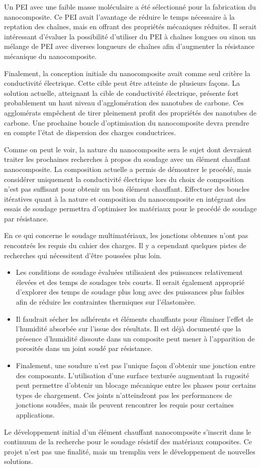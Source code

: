 Un PEI avec une faible masse moléculaire a été sélectionné pour la fabrication du nanocomposite. 
Ce PEI avait l'avantage de réduire le temps nécessaire à la reptation des chaînes, mais en offrant des propriétés mécaniques réduites. 
Il serait intéressant d'évaluer la possibilité d'utiliser du PEI à chaînes longues ou sinon un mélange de PEI avec diverses longueurs de chaînes afin d'augmenter la résistance mécanique du nanocomposite. 

Finalement, la conception initiale du nanocomposite avait comme seul critère la conductivité électrique. 
Cette cible peut être atteinte de plusieurs façons. 
La solution actuelle, atteignant la cible de conductivité électrique, présente fort probablement un haut niveau d'agglomération des nanotubes de carbone. 
Ces agglomérats empêchent de tirer pleinement profit des propriétés des nanotubes de carbone. 
Une prochaine boucle d'optimisation du nanocomposite devra prendre en compte l'état de dispersion des charges conductrices. 

Comme on peut le voir, la nature du nanocomposite sera le sujet dont devraient traiter les prochaines recherches à propos du soudage avec un élément chauffant nanocomposite. 
La composition actuelle a permis de démontrer le procédé, mais considérer uniquement la conductivité électrique lors du choix de composition n'est pas suffisant pour obtenir un bon élément chauffant.
Effectuer des boucles itératives quant à la nature et composition du nanocomposite en intégrant des essais de soudage permettra d'optimiser les matériaux pour le procédé de soudage par résistance. 

En ce qui concerne le soudage multimatériaux, les jonctions obtenues n'ont pas rencontrés les requis du cahier des charges. 
Il y a cependant quelques pistes de recherches qui nécessitent d'être poussées plus loin. 

\begin{itemize}
	\item Les conditions de soudage évaluées utilisaient des puissances relativement élevées et des temps de soudages très courts. 
	Il serait également approprié d'explorer des temps de soudage plus long avec des puissances plus faibles afin de réduire les contraintes thermiques sur l'élastomère. 
	\item Il faudrait sécher les adhérents et éléments chauffants pour éliminer l'effet de l'humidité absorbée sur l'issue des résultats. 
	Il est déjà documenté que la présence d'humidité dissoute dans un composite peut mener à l'apparition de porosités dans un joint soudé par résistance. 
	\item Finalement, une soudure n'est pas l'unique façon d'obtenir une jonction entre des composants. 
	L'utilisation d'une surface texturée augmentant la rugosité peut permettre d'obtenir un blocage mécanique entre les phases pour certains types de chargement. 
	Ces joints n'atteindront pas les performances de jonctions soudées, mais ils peuvent rencontrer les requis pour certaines applications. 
\end{itemize}

Le développement initial d'un élément chauffant nanocomposite s'inscrit dans le continuum de la recherche pour le soudage résistif des matériaux composites. 
Ce projet n'est pas une finalité, mais un tremplin vers le développement de nouvelles solutions. 